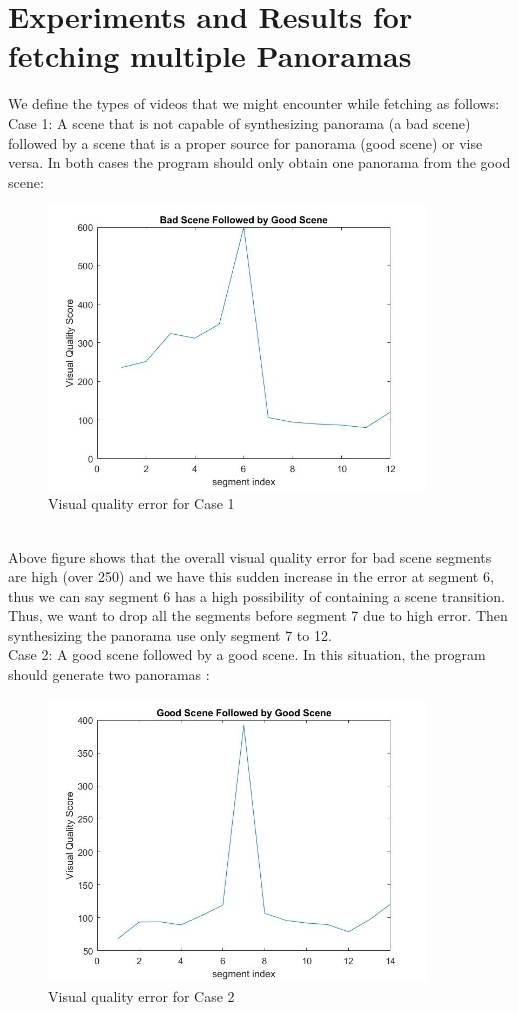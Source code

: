 \documentclass[12pt]{article}
\begin{document}
\section{Experiments and Results for fetching multiple Panoramas}
We define the types of videos that we might encounter while fetching as follows: \\
Case 1: A scene that is not capable of synthesizing panorama (a bad scene) followed by a scene that is a proper source for panorama (good scene) or vise versa. In both cases the program should only obtain one panorama from the good scene:
\begin{figure}[h]
	\centering
	\includegraphics[width=10cm]{bad-good-fig}
	\caption{Visual quality error for Case 1}
\end{figure}\\
Above figure shows that the overall visual quality error for bad scene segments are high (over 250) and we have this sudden increase in the error at segment 6, thus we can say segment 6 has a high possibility of containing a scene transition. Thus, we want to drop all the segments before segment 7 due to high error. Then synthesizing the panorama use only segment 7 to 12.\\
Case 2: A good scene followed by a good scene. In this situation, the program should generate two panoramas :
\begin{figure}[h]
	\centering
	\includegraphics[width=10cm]{good-good-fig}
	\caption{Visual quality error for Case 2}
\end{figure}\\
\end{document}
